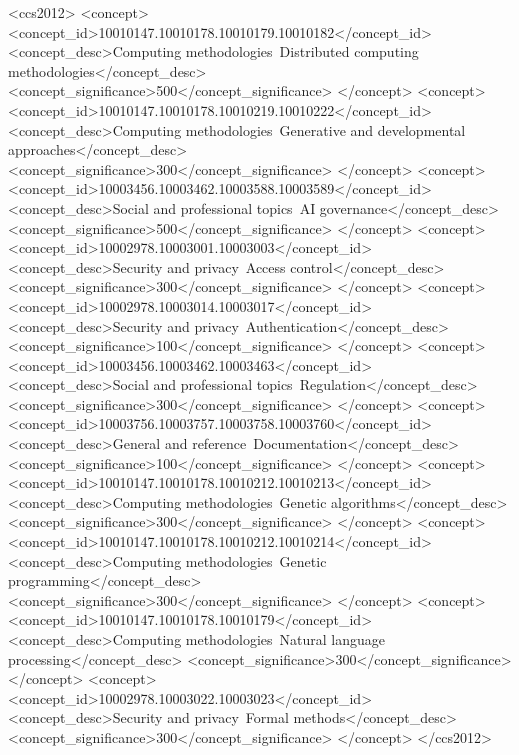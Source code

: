 \documentclass[manuscript,screen,9pt]{acmart}
\begin{document}
\begin{CCSXML}
	<ccs2012>
	<concept>
	<concept_id>10010147.10010178.10010179.10010182</concept_id>
	<concept_desc>Computing methodologies~Distributed computing methodologies</concept_desc>
	<concept_significance>500</concept_significance>
	</concept>
	<concept>
	<concept_id>10010147.10010178.10010219.10010222</concept_id>
	<concept_desc>Computing methodologies~Generative and developmental approaches</concept_desc>
	<concept_significance>300</concept_significance>
	</concept>
	<concept>
	<concept_id>10003456.10003462.10003588.10003589</concept_id>
	<concept_desc>Social and professional topics~AI governance</concept_desc>
	<concept_significance>500</concept_significance>
	</concept>
	<concept>
	<concept_id>10002978.10003001.10003003</concept_id>
	<concept_desc>Security and privacy~Access control</concept_desc>
	<concept_significance>300</concept_significance>
	</concept>
	<concept>
	<concept_id>10002978.10003014.10003017</concept_id>
	<concept_desc>Security and privacy~Authentication</concept_desc>
	<concept_significance>100</concept_significance>
	</concept>
	<concept>
	<concept_id>10003456.10003462.10003463</concept_id>
	<concept_desc>Social and professional topics~Regulation</concept_desc>
	<concept_significance>300</concept_significance>
	</concept>
	<concept>
	<concept_id>10003756.10003757.10003758.10003760</concept_id>
	<concept_desc>General and reference~Documentation</concept_desc>
	<concept_significance>100</concept_significance>
	</concept>
	<concept>
	<concept_id>10010147.10010178.10010212.10010213</concept_id>
	<concept_desc>Computing methodologies~Genetic algorithms</concept_desc>
	<concept_significance>300</concept_significance>
	</concept>
	<concept>
	<concept_id>10010147.10010178.10010212.10010214</concept_id>
	<concept_desc>Computing methodologies~Genetic programming</concept_desc>
	<concept_significance>300</concept_significance>
	</concept>
	<concept>
	<concept_id>10010147.10010178.10010179</concept_id>
	<concept_desc>Computing methodologies~Natural language processing</concept_desc>
	<concept_significance>300</concept_significance>
	</concept>
	<concept>
	<concept_id>10002978.10003022.10003023</concept_id>
	<concept_desc>Security and privacy~Formal methods</concept_desc>
	<concept_significance>300</concept_significance>
	</concept>
	</ccs2012>
\end{CCSXML}

\end{document}

